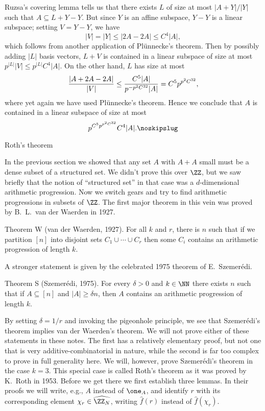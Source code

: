 Ruzsa's covering lemma tells us that there exists $L$ of size at most $|A+Y|/|Y|$ such that $A\subseteq L+Y-Y$.
But since $Y$ is an affine subspace, $Y-Y$ is a linear subspace; setting $V = Y-Y$, we have
$$|V| = |Y| \le |2A-2A| \le C^4|A|,$$
which follows from another application of Pl\"unnecke's theorem.
Then by possibly adding $|L|$ basis vectors, $L+V$ is contained in a linear subspace of size at most $p^{|L|} |V|
\le p^{|L|} C^4|A|$.
On the other hand, $L$ has size at most
$${|A+2A-2A|\over |V|} \le {C^5|A| \over p^{-p^2C^{32}} |A|} = C^5p^{p^2C^{32}},$$
where yet again we have used Pl\"unnecke's theorem.
Hence we conclude that $A$ is contained in a linear subspace of size at most
$$ p^{C^5 p^{p^2C^{32}}} C^4|A|.\noskipslug$$

\advsect Roth's theorem

In the previous section we showed that any set $A$ with $A+A$ small
must be a dense subset of a structured set. We didn't prove this over $\ZZ$, but we saw briefly that
the notion of ``structured set'' in that case was a $d$-dimensional arithmetic progression. Now we switch
gears and try to find arithmetic progressions in subsets of $\ZZ$. The first major theorem in this vein was
proved by B.~L.~van der Waerden in 1927.

\parenproclaim Theorem W (van der Waerden, {\rm 1927}). For all $k$ and $r$, there is $n$ such
that if we partition $[n]$ into disjoint sets $C_1\cup \cdots \cup C_r$ then some $C_i$ contains an
arithmetic progression of length $k$.\slug

A stronger statement is given by the celebrated 1975 theorem of E.~Szemer\'edi.

\parenproclaim Theorem S (Szemer\'edi, {\rm 1975}). For every $\delta>0$ and $k\in \NN$ there
exists $n$ such that if $A\subseteq [n]$ and $|A|\ge \delta n$, then $A$ contains an arithmetic progression
of length $k$.\slug

By setting $\delta = 1/r$ and invoking the pigeonhole principle, we see that
Szemer\'edi's theorem implies van der Waerden's theorem. We will not prove either of these statements in
these notes. The first has a relatively elementary proof, but not one that is very additive-combinatorial
in nature, while the second is far too complex to prove in full generality here. We will, however,
prove Szemer\'edi's theorem in the case $k=3$. This special case is called Roth's theorem as it was
proved by K.~Roth in 1953.
Before we get there we first establish three lemmas. In their proofs we will write, e.g., $A$ instead
of $\one_A$, and identify
$r$ with its corresponding element $\chi_r\in \hat{\ZZ_N}$, writing $\hat f(r)$ instead of $\hat f(\chi_r)$.

